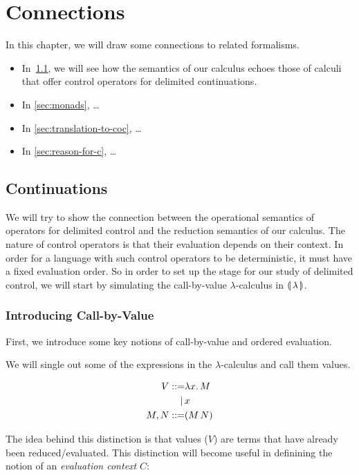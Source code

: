 \chapter{Connections}

In this chapter, we will draw some connections to related formalisms.

\begin{itemize}
\item In~\ref{sec:continuations}, we will see how the semantics of our
  calculus echoes those of calculi that offer control operators for
  delimited continuations.
\item In \ref{sec:monads}, \ldots
\item In \ref{sec:translation-to-coc}, \ldots
\item In \ref{sec:reason-for-c}, \ldots
\end{itemize}

\section{Continuations}
\label{sec:continuations}

We will try to show the connection between the operational semantics of
operators for delimited control and the reduction semantics of our
calculus. The nature of control operators is that their evaluation depends
on their context. In order for a language with such control operators to be
deterministic, it must have a fixed evaluation order. So in order to set up
the stage for our study of delimited control, we will start by simulating
the call-by-value $\lambda$-calculus in $\llparenthesis \, \lambda \, \rrparenthesis$.

\subsection{Introducing Call-by-Value}

First, we introduce some key notions of call-by-value and ordered
evaluation.

We will single out some of the expressions in the $\lambda$-calculus and
call them values.

\begin{align*}
  V ::= & \lambda x.\, M \\
   | \, & x \\
  M,N ::= & (M\,N)
\end{align*}

The idea behind this distinction is that values ($V$) are terms that have
already been reduced/evaluated. This distinction will become useful in
definining the notion of an \emph{evaluation context} $C$:

